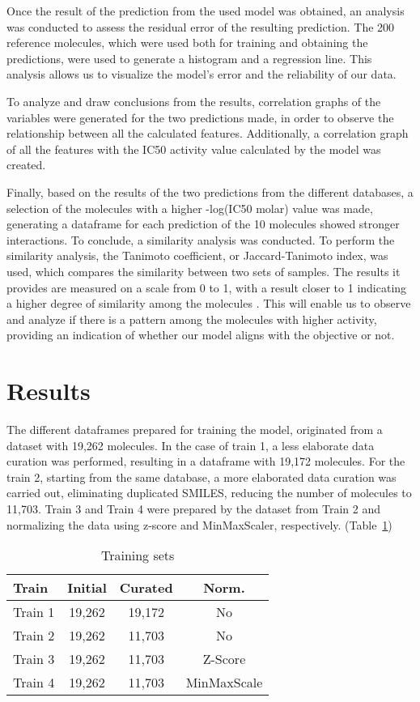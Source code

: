 \documentclass[final,times,twocolumn,article]{elsarticle}
\begin{document}
Once the result of the prediction from the used model was obtained, an analysis was conducted to assess the residual error of the resulting prediction. The 200 reference molecules, which were used both for training and obtaining the predictions, were used to generate a histogram and a regression line. This analysis allows us to visualize the model's error and the reliability of our data. 

To analyze and draw conclusions from the results, correlation graphs of the variables were generated for the two predictions made, in order to observe the relationship between all the calculated features. Additionally, a correlation graph of all the features with the IC50 activity value calculated by the model was created. 

Finally, based on the results of the two predictions from the different databases, a selection of the molecules with a higher -log(IC50 molar) value was made, generating a dataframe for each prediction of the 10 molecules showed stronger interactions. To conclude, a similarity analysis was conducted. To perform the similarity analysis, the Tanimoto coefficient, or Jaccard-Tanimoto index, was used, which compares the similarity between two sets of samples. The results it provides are measured on a scale from 0 to 1, with a result closer to 1 indicating a higher degree of similarity among the molecules \cite{Bajusz2015}. This will enable us to observe and analyze if there is a pattern among the molecules with higher activity, providing an indication of whether our model aligns with the objective or not. 

\section{Results}

The different dataframes prepared for training the model, originated from a dataset with 19,262 molecules. In the case of train 1, a less elaborate data curation was performed, resulting in a dataframe with 19,172 molecules. For the train 2, starting from the same database, a more elaborated data curation was carried out, eliminating duplicated SMILES, reducing the number of molecules to 11,703. Train 3 and Train 4 were prepared by the dataset from Train 2 and normalizing the data using z-score and MinMaxScaler, respectively. (Table~\ref{Table1})

\begin{table}[ht]
\centering
\begin{tabular}{l c c c} 
     \hline
     Train & Initial & Curated & Norm.\\ 
     \hline
     Train 1 & 19,262 & 19,172 & No\\
     \hline
     Train 2 & 19,262 & 11,703 & No \\
     \hline
     Train 3 & 19,262 & 11,703 & Z-Score\\ 
     \hline
     Train 4 & 19,262 & 11,703 & MinMaxScale\\ 
     \hline
    \end{tabular}
\caption{Training sets}
\label{Table1}
\end{table}
\end{document}
